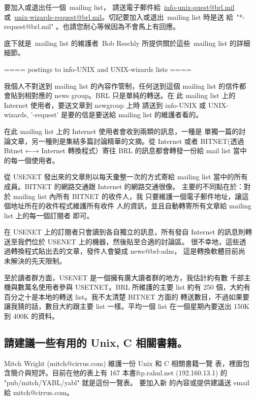 \documentclass{article}
\begin{document}
\begin{CJK*}{Bg5}{ming}
      要加入或退出任一個~mailing list， 請送電子郵件給~\url{info-unix-quest@brl.mil}
      或~\url{unix-wizards-request@brl.mil}。切記要加入或退出~mailing list 時是送
      給~"*-request@brl.mil" 。也請您耐心等候因為不會馬上有回應。
        
      底下就是~mailing list 的維護者~Bob Reschly 所提供關於這些~mailing list 
      的詳細細節。

      ==== postings to info-UNIX and UNIX-wizards lists ====

      我個人不對送到 mailing list 的內容作管制，任何送到這個 mailing 
      list 的信件都會貼到相對應的 news group。BRL 只是單純的轉送。在
      此 mailing list 上的 Internet 使用者，要送文章到 newgroup 上時
      請送到 info-UNIX 或 UNIX-wizards, '-request' 是要的信是要送給 
      mailing list 的維護者看的。

      在此 mailing list 上的 Internet 使用者會收到兩類的訊息，一種是
      單獨一篇的討論文章，另一種則是集結多篇討論精華的文摘。從 
      Internet 或者 BITNET(透過 Bitnet ←→ Internet 轉換程式）寄往 
      BRL 的訊息都會轉發一份給 mail list 當中的每一個使用者。


      從 USENET 發出來的文章則以每天彙整一次的方式寄給 mailing list 
      當中的所有成員。BITNET 的網路交通跟 Internet 的網路交通很像。
      主要的不同點在於：對於 mailing list 內所有 BITNET 的收件人，我
      只要維護一個電子郵件地址，讓這個地址所在的收件程式維護所有收件
      人的資訊，並且自動轉寄所有文章給 mailing list 上的每一個訂閱者
      即可。

      在 USENET 上的訂閱者只會讀到各自獨立的訊息，所有發自 Internet 
      的訊息則轉送至我們位於 USENET 上的機器，然後貼至合適的討論區。
      很不幸地，這些透過轉換程式貼出去的文章，發件人會變成 news@brl-adm，
      這是轉換軟體目前尚未解決的先天限制。

      至於讀者群方面，USENET 是一個擁有廣大讀者群的地方，我估計約有數
      千部主機與數萬名使用者參與 USETNET。BRL 所維護的主要 list 約有 
      250 個，大約有百分之十是本地的轉送 list。我不太清楚 BITNET 方面的
      轉送數目，不過如果要讓我猜的話，數目大約跟主要 list 一樣。平均一個 
      list 在一個星期內要送出 150K 到 400K 的資料。


\subsection{請建議一些有用的 Unix, C 相關書籍。}

	Mitch  Wright (mitch@cirrus.com) 維護一份 Unix 和 C 相關書籍一覽
	表，裡面包含簡介與短評。目前在他的表上有 167 本書ftp.rahul.net 
	(192.160.13.1) 的 "pub/mitch/YABL/yabl" 就是這份一覽表。 要加入新
	的內容或提供建議送 email 給 mitch@cirrus.com。


\end{CJK*}
\end{document}
